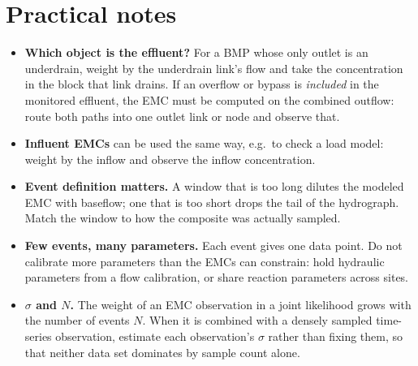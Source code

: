 \documentclass[11pt,a4paper]{article}
\begin{document}
\section{Practical notes}
\begin{itemize}[leftmargin=1.4em]
  \item \textbf{Which object is the effluent?} For a BMP whose only outlet is an
        underdrain, weight by the underdrain link's flow and take the
        concentration in the block that link drains. If an overflow or bypass is
        \emph{included} in the monitored effluent, the EMC must be computed on
        the combined outflow: route both paths into one outlet link or node and
        observe that.
  \item \textbf{Influent EMCs} can be used the same way, e.g.\ to check a load
        model: weight by the inflow and observe the inflow concentration.
  \item \textbf{Event definition matters.} A window that is too long dilutes the
        modeled EMC with baseflow; one that is too short drops the tail of the
        hydrograph. Match the window to how the composite was actually sampled.
  \item \textbf{Few events, many parameters.} Each event gives one data point. Do
        not calibrate more parameters than the EMCs can constrain: hold hydraulic
        parameters from a flow calibration, or share reaction parameters across
        sites.
  \item \textbf{$\sigma$ and $N$.} The weight of an EMC observation in a joint
        likelihood grows with the number of events $N$. When it is combined with
        a densely sampled time-series observation, estimate each observation's
        $\sigma$ rather than fixing them, so that neither data set dominates by
        sample count alone.
\end{itemize}
\end{document}

